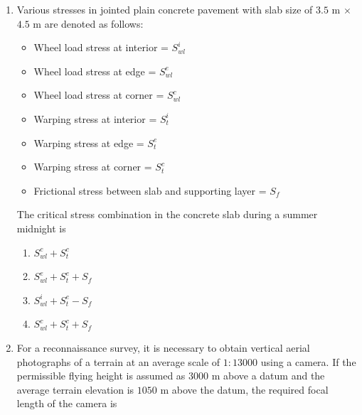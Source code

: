 \documentclass[journal,12pt,onecolumn]{article}
\theoremstyle{remark}
\begin{document}
\begin{enumerate}
    \item Various stresses in jointed plain concrete pavement with slab size of
    $3.5$ m $\times$ $4.5$ m are denoted as follows:
   \begin{itemize}
    \item Wheel load stress at interior = $S_{wl}^i$
    \item Wheel load stress at edge = $S_{wl}^e$
    \item Wheel load stress at corner = $S_{wl}^c$
    \item Warping stress at interior = $S_t^i$
    \item Warping stress at edge = $S_t^e$ 
    \item Warping stress at corner = $S_t^c$ 
    \item Frictional stress between slab and supporting layer = $S_f$
    \end{itemize}
    The critical stress combination in the concrete slab during a summer midnight is
    
    \hfill{}
    \begin{enumerate}
        \item $S_{wl}^c + S_t^c$
        \item $S_{wl}^e + S_t^e + S_f$
        \item $S_{wl}^i + S_t^e - S_f$
        \item $S_{wl}^c + S_t^c + S_f$
    \end{enumerate}

    \item For a reconnaissance survey, it is necessary to obtain vertical aerial photographs of
    a terrain at an average scale of $1\colon13000$ using a camera. If the permissible flying
    height is assumed as $3000$ m above a datum and the average terrain elevation is
    $1050$ m above the datum, the required focal length  of the camera is
    
    \hfill{}
    \begin{enumerate}
    \end{enumerate}


\end{enumerate}
\end{document}
